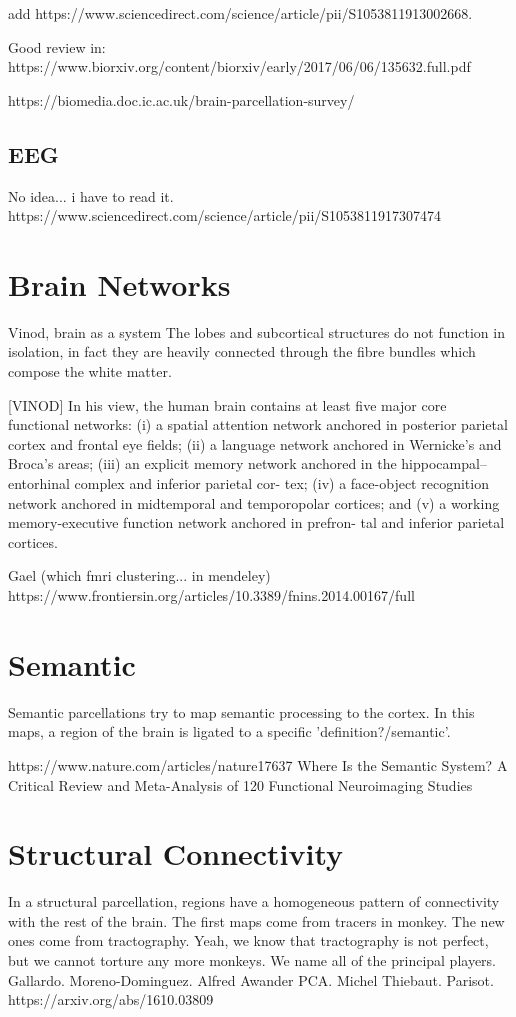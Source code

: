 add https://www.sciencedirect.com/science/article/pii/S1053811913002668.

Good review in:
https://www.biorxiv.org/content/biorxiv/early/2017/06/06/135632.full.pdf

https://biomedia.doc.ic.ac.uk/brain-parcellation-survey/

\subsection{EEG}
No idea... i have to read it.
https://www.sciencedirect.com/science/article/pii/S1053811917307474

\section{Brain Networks}
Vinod, brain as a system
The lobes and subcortical structures do not function in isolation, in fact they are heavily connected through the fibre bundles which compose the white matter.

[VINOD]
In his view, the human brain contains at least five major core functional networks: (i) a spatial attention network anchored in posterior parietal cortex and frontal eye fields;
(ii) a language network anchored in Wernicke’s and Broca’s areas; (iii) an explicit memory network anchored in the hippocampal–entorhinal complex and inferior parietal cor- tex; (iv) a face-object recognition network anchored in
midtemporal and temporopolar cortices; and (v) a working memory-executive function network anchored in prefron- tal and inferior parietal cortices. 


Gael (which fmri clustering... in mendeley)
https://www.frontiersin.org/articles/10.3389/fnins.2014.00167/full

\section{Semantic}
Semantic parcellations try to map semantic processing to the cortex.
In this maps, a region of the brain is ligated to a specific 'definition?/semantic'.

https://www.nature.com/articles/nature17637
Where Is the Semantic System? A Critical Review and Meta-Analysis of 120 Functional Neuroimaging Studies

\section{Structural Connectivity}
In a structural parcellation, regions have a homogeneous pattern of connectivity
with the rest of the brain. The first maps come from tracers in monkey. The new
ones come from tractography. Yeah, we know that tractography is not perfect,
but we cannot torture any more monkeys. We name all of the principal players.
Gallardo.
Moreno-Dominguez.
Alfred Awander PCA.
Michel Thiebaut.
Parisot. 
https://arxiv.org/abs/1610.03809

